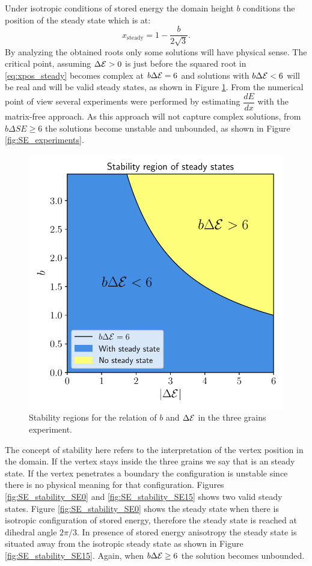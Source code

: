 Under isotropic conditions of stored energy the domain height $b$ conditions the position of the steady state which is at:
\begin{equation*}
    x_{\text{steady}} = 1 - \frac{b}{2\sqrt{3}}.
\end{equation*}
By analyzing the obtained roots only some solutions will have physical sense. The critical point, assuming $\Delta \mathcal{E} > 0$ is just before the squared root in \eqref{eq:xpos_steady} becomes complex at $b\Delta \mathcal{E} = 6$ and solutions with $b \Delta \mathcal{E} < 6$ will be real and will be valid steady states, as shown in Figure \ref{fig:SE_stability}. From the numerical point of view several experiments were performed by estimating $\dfrac{dE}{dx}$ with the matrix-free approach. As this approach will not capture complex solutions, from $b\Delta SE \geq 6$ the solutions become unstable and unbounded, as shown in Figure \ref{fig:SE_experiments}.

\begin{figure}
    \centering
    \includegraphics[scale=0.6]{figures/SE_stability.pdf}
    \caption{Stability regions for the relation of $b$ and $\Delta \mathcal{E}$ in the three grains experiment.}
    \label{fig:SE_stability}
\end{figure}

The concept of stability here refers to the interpretation of the vertex position in the domain. If the vertex stays inside the three grains we say that is an steady state. If the vertex penetrates a boundary the configuration is unstable since there is no physical meaning for that configuration. Figures \ref{fig:SE_stability_SE0} and \ref{fig:SE_stability_SE15} shows two valid steady states. Figure \ref{fig:SE_stability_SE0} shows the steady state when there is isotropic configuration of stored energy, therefore the steady state is reached at dihedral angle $2\pi/3$. In presence of stored energy anisotropy the steady state is situated away from the isotropic steady state as shown in Figure \ref{fig:SE_stability_SE15}. Again, when $b\Delta \mathcal{E} \geq 6$ the solution becomes unbounded.

